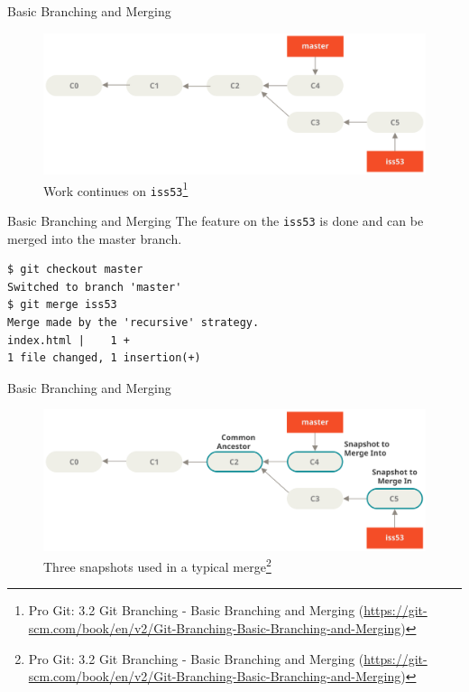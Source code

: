 \documentclass[aspectratio=169]{beamer}
\renewcommand{\footnotesize}{\tiny}
\newcommand{\sectiontitle}{}
\begin{document}
\begin{frame}[fragile]{Basic Branching and Merging}{\sectiontitle}
\begin{figure}
    \centering
    \includegraphics[width=\textwidth,height=0.5\textheight,keepaspectratio]{basic-branching-6}
    \caption{
        Work continues on \texttt{iss53}\footnote{
            Pro Git: 3.2 Git Branching - Basic Branching and Merging
            (\url{https://git-scm.com/book/en/v2/Git-Branching-Basic-Branching-and-Merging})
        }
    }
\end{figure}
\end{frame}

\begin{frame}[fragile]{Basic Branching and Merging}{\sectiontitle}
The feature on the \verb|iss53| is done and can be merged into the master branch.
\begin{verbatim}
$ git checkout master
Switched to branch 'master'
$ git merge iss53
Merge made by the 'recursive' strategy.
index.html |    1 +
1 file changed, 1 insertion(+)
\end{verbatim}
\end{frame}

\begin{frame}[fragile]{Basic Branching and Merging}{\sectiontitle}
\begin{figure}
    \centering
    \includegraphics[width=\textwidth,height=0.5\textheight,keepaspectratio]{basic-merging-1}
    \caption{
         Three snapshots used in a typical merge\footnote{
            Pro Git: 3.2 Git Branching - Basic Branching and Merging
            (\url{https://git-scm.com/book/en/v2/Git-Branching-Basic-Branching-and-Merging})
        }
    }
\end{figure}
\end{frame}
\end{document}
